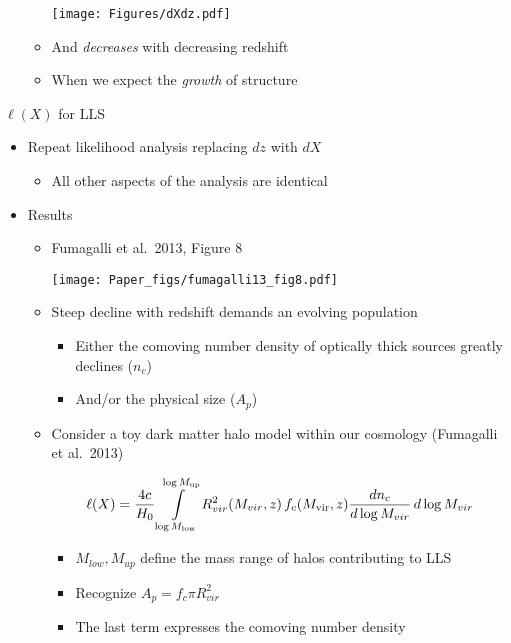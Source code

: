 \documentclass[12pt,letterpaper]{article}
\begin{document}
\begin{Aenumerate}
\begin{itemize}
\begin{itemize}
\texttt{[image: Figures/dXdz.pdf]}

  	\item And {\it decreases} with decreasing redshift
  	\item When we expect the {\it growth} of structure
  	\end{itemize}
  \end{itemize}

{\bf \item $\ell(X)$ for LLS}
  \begin{itemize}
  \item Repeat likelihood analysis replacing $dz$ with $dX$
  	\begin{itemize}
  	\item All other aspects of the analysis are identical
  	\end{itemize}
  \item Results
  	\begin{itemize}
  	\item Fumagalli et al.\ 2013, Figure 8

\texttt{[image: Paper\_figs/fumagalli13\_fig8.pdf]}

  	\item Steep decline with redshift demands an evolving population
  	\begin{itemize}
  	\item Either the comoving number density of optically thick sources
  	greatly declines ($n_c$)
  	\item And/or the physical size ($A_p$)
  	\end{itemize}

  	\item Consider a toy dark matter halo model within our cosmology (Fumagalli et al.\ 2013)

  	\begin{equation}
  	\ell(X) = \frac{4c}{H_0} \int\limits_{\log M_{\rm low}}^{\log M_{\rm up}}
  	R_{vir}^2 (M_{vir}, z) \, f_c(M_{\rm vir}, z) 
  	\frac{d n_c}{d \log M_{vir}} \, d\log M_{vir}
  	\end{equation}
  		\begin{itemize}
  		\item $M_{low}, M_{up}$ define the mass range of halos contributing to LLS
  		\item Recognize $A_p = f_c \pi R_{vir}^2$
  		\item The last term expresses the comoving number density
  		\end{itemize}


\end{itemize}
\end{itemize}
\end{Aenumerate}
\end{document}
